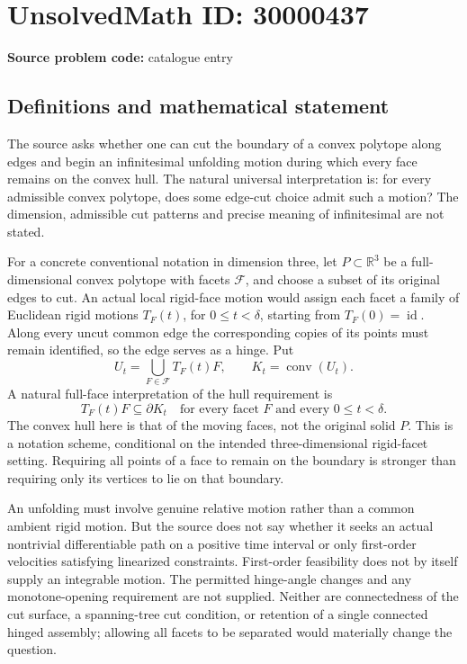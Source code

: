 \documentclass[11pt]{article}
\newcommand{\R}{\mathbb{R}}
\begin{document}
\section*{UnsolvedMath ID: 30000437}
\textbf{Source problem code:} catalogue entry
\subsection{Definitions and mathematical statement}
The source asks whether one can cut the boundary of a convex polytope along edges and begin an infinitesimal unfolding motion during which every face remains on the convex hull. The natural universal interpretation is: for every admissible convex polytope, does some edge-cut choice admit such a motion? The dimension, admissible cut patterns and precise meaning of infinitesimal are not stated.

For a concrete conventional notation in dimension three, let \(P\subset\R^3\) be a full-dimensional convex polytope with facets \(\mathcal F\), and choose a subset of its original edges to cut. An actual local rigid-face motion would assign each facet a family of Euclidean rigid motions \(T_F(t)\), for \(0\leq t<\delta\), starting from \(T_F(0)=\operatorname{id}\). Along every uncut common edge the corresponding copies of its points must remain identified, so the edge serves as a hinge. Put
\[
 U_t=\bigcup_{F\in\mathcal F}T_F(t)F,\qquad K_t=\operatorname{conv}(U_t).
\]
A natural full-face interpretation of the hull requirement is
\[
 T_F(t)F\subseteq\partial K_t\quad
 \text{for every facet }F\text{ and every }0\leq t<\delta.
\]
The convex hull here is that of the moving faces, not the original solid \(P\). This is a notation scheme, conditional on the intended three-dimensional rigid-facet setting. Requiring all points of a face to remain on the boundary is stronger than requiring only its vertices to lie on that boundary.

An unfolding must involve genuine relative motion rather than a common ambient rigid motion. But the source does not say whether it seeks an actual nontrivial differentiable path on a positive time interval or only first-order velocities satisfying linearized constraints. First-order feasibility does not by itself supply an integrable motion. The permitted hinge-angle changes and any monotone-opening requirement are not supplied. Neither are connectedness of the cut surface, a spanning-tree cut condition, or retention of a single connected hinged assembly; allowing all facets to be separated would materially change the question.
\end{document}
